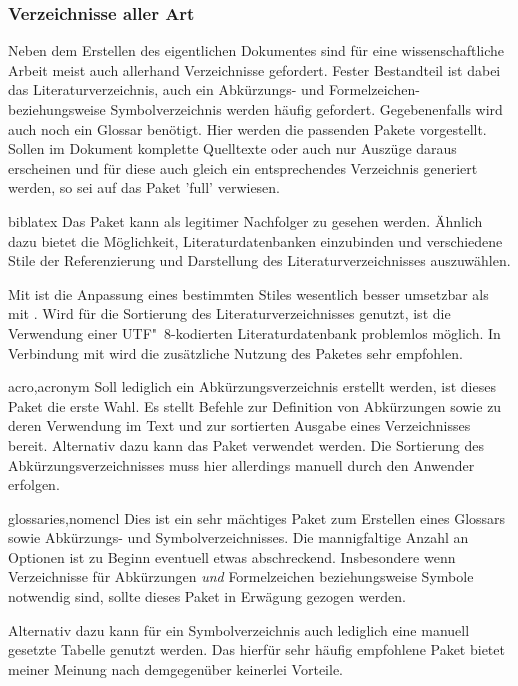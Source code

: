 \subsubsection{Verzeichnisse aller Art}
%
%
Neben dem Erstellen des eigentlichen Dokumentes sind für eine wissenschaftliche 
Arbeit meist auch allerhand Verzeichnisse gefordert. Fester Bestandteil ist 
dabei das Literaturverzeichnis, auch ein Abkürzungs- und Formelzeichen- 
beziehungsweise Symbolverzeichnis werden häufig gefordert. Gegebenenfalls wird 
auch noch ein Glossar benötigt. Hier werden die passenden Pakete vorgestellt. 
Sollen im Dokument komplette Quelltexte oder auch nur Auszüge daraus erscheinen 
und für diese auch gleich ein entsprechendes Verzeichnis generiert werden, so 
sei auf das Paket 'full' verwiesen.

\begin{packages}
\item[biblatex]
  Das Paket kann als legitimer Nachfolger zu  gesehen werden. 
  Ähnlich dazu bietet  die Möglichkeit, Literaturdatenbanken 
  einzubinden und verschiedene Stile der Referenzierung und Darstellung des 
  Literaturverzeichnisses auszuwählen. 
  
  Mit  ist die Anpassung eines bestimmten Stiles wesentlich 
  besser umsetzbar als mit . Wird  für die 
  Sortierung des Literaturverzeichnisses genutzt, ist die Verwendung einer 
  UTF"~8-kodierten Literaturdatenbank problemlos möglich. In Verbindung mit 
   wird die zusätzliche Nutzung des Paketes 
   sehr empfohlen.
\item[acro,acronym]
  Soll lediglich ein Abkürzungsverzeichnis erstellt werden, ist dieses Paket 
  die erste Wahl. Es stellt Befehle zur Definition von Abkürzungen sowie zu 
  deren Verwendung im Text und zur sortierten Ausgabe eines Verzeichnisses 
  bereit. Alternativ dazu kann das Paket  verwendet werden. 
  Die Sortierung des Abkürzungsverzeichnisses muss hier allerdings manuell 
  durch den Anwender erfolgen.
\item[glossaries,nomencl]
  Dies ist ein sehr mächtiges Paket zum Erstellen eines Glossars sowie 
  Abkürzungs- und Symbolverzeichnisses. Die mannigfaltige Anzahl an Optionen 
  ist zu Beginn eventuell etwas abschreckend. Insbesondere wenn Verzeichnisse 
  für Abkürzungen \emph{und} Formelzeichen beziehungsweise Symbole notwendig 
  sind, sollte dieses Paket in Erwägung gezogen werden.
  
  Alternativ dazu kann für ein Symbolverzeichnis auch lediglich eine manuell 
  gesetzte Tabelle genutzt werden. Das hierfür sehr häufig empfohlene Paket 
   bietet meiner Meinung nach demgegenüber keinerlei Vorteile.
%
\end{packages}


